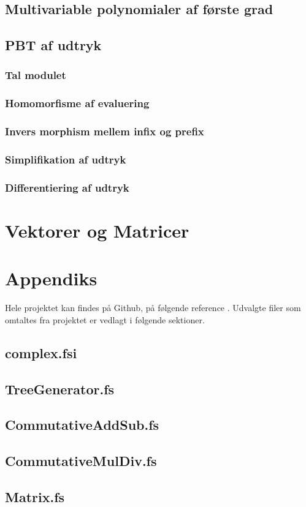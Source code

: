 \documentclass{article}
\begin{document}
\subsection{Multivariable polynomialer af første grad}

\subsection{PBT af udtryk} %
\subsubsection{Tal modulet}\label{sec:PBT_number}
\subsubsection{Homomorfisme af evaluering}\label{sec:PBT_eval_homomorphism}
\subsubsection{Invers morphism mellem infix og prefix}\label{sec:PBT_infix_prefix}
\subsubsection{Simplifikation af udtryk}\label{sec:PBT_simplification}
\subsubsection{Differentiering af udtryk}\label{sec:PBT_differentiation}

\section{Vektorer og Matricer}


\section{Appendiks}
Hele projektet kan findes på Github, på følgende reference \cite{github_repo}. Udvalgte filer som omtaltes fra projektet er vedlagt i følgende sektioner.
\subsection{complex.fsi} \label{sec:complex.fsi}
\subsection{TreeGenerator.fs} \label{sec:treeGenerator.fs}
\subsection{CommutativeAddSub.fs} \label{sec:commutativeAddSub.fs}
\subsection{CommutativeMulDiv.fs} \label{sec:commutativeMulDiv.fs}
\subsection{Matrix.fs} \label{sec:matrix.fs}

\newpage
\printbibliography
\end{document}
